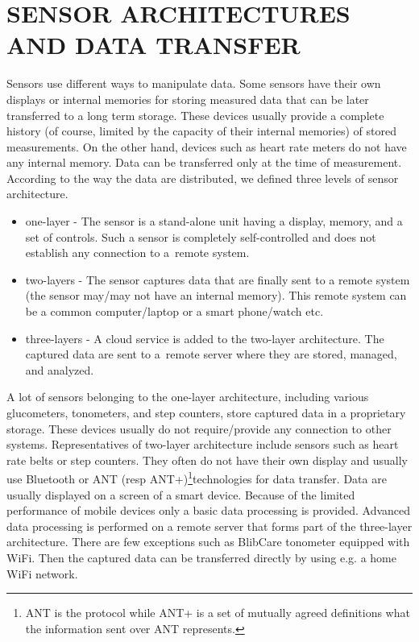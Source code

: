 \documentclass[a4paper,twoside]{article}
\begin{document}
\section{\uppercase{Sensor Architectures and Data Transfer}}
\label{topology_data_transfer}

\noindent
Sensors use different ways to manipulate data. Some sensors have their own displays or internal memories for storing measured data that can be later transferred to a long term storage. These devices usually provide a complete history (of course, limited by the capacity of their internal memories) of stored measurements. On the other hand, devices such as heart rate meters do not have any internal memory. Data can be transferred only at the time of measurement. According to the way the data are distributed, we defined three levels of sensor architecture.

\begin{itemize}
 \item one-layer - The sensor is a stand-alone unit having a display, memory, and a set of controls. Such a sensor is completely self-controlled and does not establish any connection to a~remote system.
 \item two-layers - The sensor captures data that are finally sent to a remote system (the sensor may/may not have an internal memory). This remote system can be a common computer/laptop or a smart phone/watch etc.
 \item three-layers - A cloud service is added to the two-layer architecture. The captured data are sent to a~remote server where they are stored, managed, and analyzed.
\end{itemize}

 A lot of sensors belonging to the one-layer architecture, including various glucometers, tonometers, and step counters, store captured data in a proprietary storage. These devices usually do not require/provide any connection to other systems. Representatives of two-layer architecture include sensors such as heart rate belts or  step counters. They often do not have their own display and usually use Bluetooth or ANT (resp ANT+)\footnote{ANT is the protocol while ANT+ is a set of mutually agreed definitions what the information sent over ANT represents.}technologies  for data transfer. Data are usually displayed on a screen of a smart device. Because of the limited performance of mobile devices only a basic data processing is provided. Advanced data processing is performed on a remote server that forms part of the three-layer architecture. There are few exceptions such as BlibCare tonometer equipped with WiFi. Then the captured data can be transferred directly by using e.g. a home WiFi network.
\end{document}
